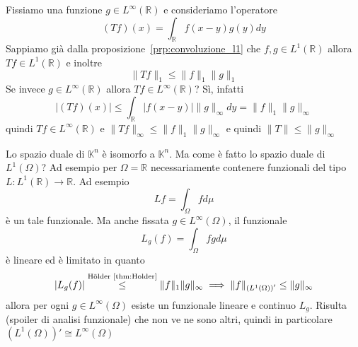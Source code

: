 \begin{example}
    Fissiamo una funzione \(g \in L^{\infty}{(\mathbb{R})}\) e consideriamo
    l'operatore 
    \[
        (Tf)(x)= \int_{\mathbb{R}} f{(x - y)}g{(y)}dy
    \]
    Sappiamo già dalla proposizione~\ref{prp:convoluzione_l1} che \(f, g \in
    L^{1}{(\mathbb{R})}\) allora \(Tf \in L^{1}{(\mathbb{R})}\) e inoltre 
    \[
      \|Tf\|_1 \le  \|f\|_1\|g\|_1
    \]
    Se invece \(g \in L^{\infty}{(\mathbb{R})}\) allora \(Tf \in
    L^{\infty}{(\mathbb{R})}\)? Sì, infatti 
    \[
      |(Tf){(x)}| \le \int_{\mathbb{R}} |f{(x-y)}| \|g\|_{\infty} dy = \|f\|_1
      \|g\|_{\infty} 
    \]
    quindi \(Tf \in L^{\infty}{(\mathbb{R})}\) e \(\|Tf\|_\infty \le \|f\|_1
    \|g\|_\infty\) e quindi \(\|T\| \le \|g\|_\infty\) 
\end{example}
\begin{example}
    Lo spazio duale di \(\mathbb{K}^{n}\) è isomorfo a \(\mathbb{K}^{n}\). Ma
    come è fatto lo spazio duale di \(L^{1}{(\Omega)}\)? Ad esempio per \(\Omega
    = \mathbb{R}\) necessariamente contenere funzionali del tipo \(L :
    L^{1}{(\mathbb{R})} \to \mathbb{R}\). Ad esempio 
    \[
      Lf = \int_{\Omega} f d\mu
    \]
    è un tale funzionale. Ma anche fissata \(g \in L^{\infty}{(\Omega)}\), il
    funzionale
    \[
      L_g{(f)} = \int_{\Omega} fg d\mu
    \]
    è lineare ed è limitato in quanto
    \[
        |L_g{(f)}| \overset{\text{Hölder~\ref{thm:Holder}}}{\le } \|f\|_1 \|g\|_\infty \implies
      \|f\|_{{\left( L^{1}{(\Omega)} \right)}'}  \le \|g\|_\infty
    \]
    allora per ogni \(g \in L^{\infty}{(\Omega)}\) esiste un funzionale lineare
    e continuo \(L_g\). Risulta (spoiler di analisi funzionale) che non ve ne
    sono altri, quindi in particolare \({\left( L^{1}{(\Omega)} \right)}'
    \cong L^{\infty}{(\Omega)}\)
\end{example}
